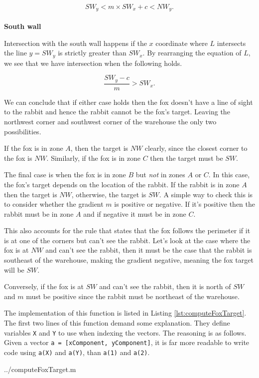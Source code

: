 $$ SW_y < m \times SW_x + c < NW_y.$$\\

\noindent \textbf{South wall}

Intersection with the south wall happens if the $x$ coordinate where $L$ intersects the line $y = SW_y$ is strictly greater than $SW_x$. By rearranging the equation of $L$, we see that we have intersection when the following holds.

$$ \frac{SW_y - c}{m} > SW_x. $$

We can conclude that if either case holds then the fox doesn't have a line of sight to the rabbit and hence the rabbit cannot be the fox's target. Leaving the northwest corner and southwest corner of the warehouse the only two possibilities.

If the fox is in zone $A$, then the target is $NW$ clearly, since the closest corner to the fox is $NW$. Similarly, if the fox is in zone $C$ then the target must be $SW$. 

The final case is when the fox is in zone $B$ but \emph{not} in zones $A$ or $C$. In this case, the fox's target depends on the location of the rabbit. If the rabbit is in zone $A$ then the target is $NW$, otherwise, the target is $SW$. A simple way to check this is to consider whether the gradient $m$ is positive or negative. If it's positive then the rabbit must be in zone $A$ and if negative it must be in zone $C$.

This also accounts for the rule that states that the fox follows the perimeter if it is at one of the corners but can't see the rabbit. Let's look at the case where the fox is at $NW$ and can't see the rabbit, then it must be the case that the rabbit is southeast of the warehouse, making the gradient negative, meaning the fox target will be $SW$.

Conversely, if the fox is at $SW$ and can't see the rabbit, then it is north of $SW$ and $m$ must be positive since the rabbit must be northeast of the warehouse.

The implementation of this function is listed in Listing \ref{lst:computeFoxTarget}. The first two lines of this function demand some explanation. They define variables \texttt{X} and \texttt{Y} to use when indexing the vectors. The reasoning is as follows. Given a vector \texttt{a = [xComponent, yComponent]}, it is far more readable to write code using \texttt{a(X)} and \texttt{a(Y)}, than \texttt{a(1)} and \texttt{a(2)}.

  {../computeFoxTarget.m}